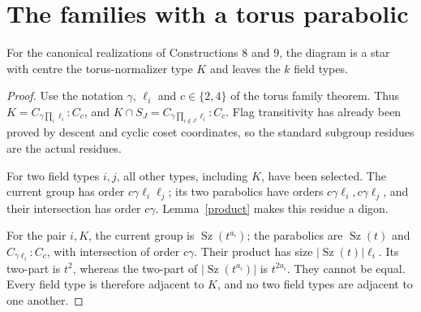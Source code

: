 \documentclass[11pt,a4paper]{article}
\newcommand{\Sz}{\operatorname{Sz}}
\begin{document}
\section{The families with a torus parabolic}
\begin{proposition}
For the canonical realizations of Constructions 8 and 9, the diagram
is a star with centre the torus-normalizer type $K$ and leaves the
$k$ field types.
\end{proposition}
\begin{proof}
Use the notation $\gamma$, $\ell_i$ and $c\in\{2,4\}$ of the torus
family theorem. Thus $K=C_{\gamma\prod_i\ell_i}:C_c$, and
$K\cap S_J=C_{\gamma\prod_{i\notin J}\ell_i}:C_c$.
Flag transitivity has already been proved by descent and cyclic coset
coordinates, so the standard subgroup residues are the actual residues.

For two field types $i,j$, all other types, including $K$, have been
selected. The current group has order $c\gamma\ell_i\ell_j$;
its two parabolics have orders $c\gamma\ell_i,c\gamma\ell_j$,
and their intersection has order $c\gamma$. Lemma~\ref{product}
makes this residue a digon.

For the pair $i,K$, the current group is $\Sz(t^{a_i})$;
the parabolics are $\Sz(t)$ and $C_{\gamma\ell_i}:C_c$,
with intersection of order $c\gamma$. Their product has size
$|\Sz(t)|\ell_i$. Its two-part is $t^2$, whereas the two-part
of $|\Sz(t^{a_i})|$ is $t^{2a_i}$. They cannot be equal.
Every field type is therefore adjacent to $K$, and no two field
types are adjacent to one another.
\end{proof}
\end{document}
